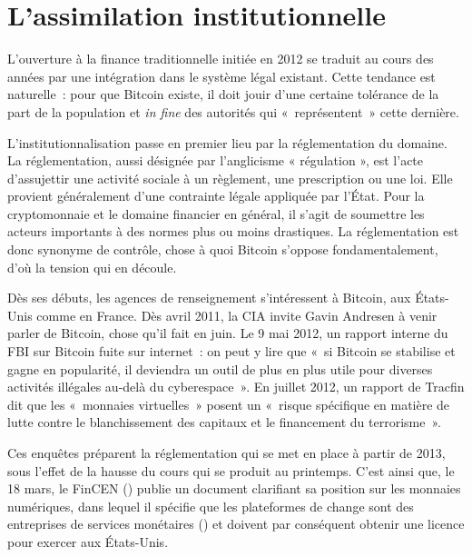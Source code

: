\section*{L'assimilation institutionnelle} %

L'ouverture à la finance traditionnelle initiée en 2012 se traduit au cours des années par une intégration dans le système légal existant. Cette tendance est naturelle~: pour que Bitcoin existe, il doit jouir d'une certaine tolérance de la part de la population et \emph{in fine} des autorités qui «~représentent~» cette dernière.

L'institutionnalisation passe en premier lieu par la réglementation du domaine. La réglementation, aussi désignée par l'anglicisme « régulation », est l'acte d'assujettir une activité sociale à un règlement, une prescription ou une loi. Elle provient généralement d'une contrainte légale appliquée par l'État. Pour la cryptomonnaie et le domaine financier en général, il s'agit de soumettre les acteurs importants à des normes plus ou moins drastiques. La réglementation est donc synonyme de contrôle, chose à quoi Bitcoin s'oppose fondamentalement, d'où la tension qui en découle.

Dès ses débuts, les agences de renseignement s'intéressent à Bitcoin, aux États-Unis comme en France. Dès avril 2011, la CIA invite Gavin Andresen à venir parler de Bitcoin, chose qu'il fait en juin. Le 9 mai 2012, un rapport interne du FBI sur Bitcoin fuite sur internet~: on peut y lire que «~si Bitcoin se stabilise et gagne en popularité, il deviendra un outil de plus en plus utile pour diverses activités illégales au-delà du cyberespace~». En juillet 2012, un rapport de Tracfin dit que les «~monnaies virtuelles~» posent un «~risque spécifique en matière de lutte contre le blanchissement des capitaux et le financement du terrorisme~».

Ces enquêtes préparent la réglementation qui se met en place à partir de 2013, sous l'effet de la hausse du cours qui se produit au printemps. C'est ainsi que, le 18 mars, le FinCEN () publie un document clarifiant sa position sur les monnaies numériques, dans lequel il spécifie que les plateformes de change sont des entreprises de services monétaires () et doivent par conséquent obtenir une licence pour exercer aux États-Unis.

